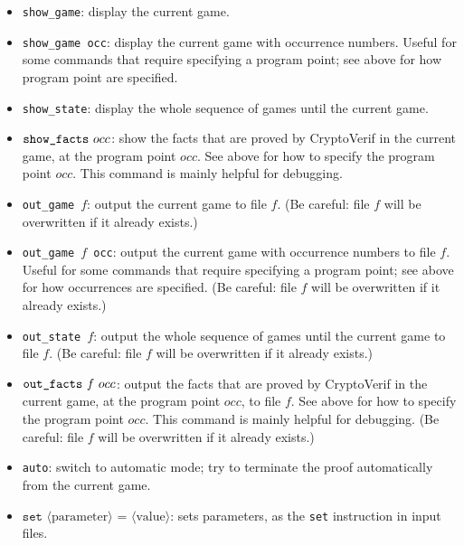 \documentclass{article}
\newcommand{\nonterm}[1]{\langle\textrm{#1}\rangle}
\begin{document}
\begin{itemize}
\item \texttt{show\string_game}: display the current game.

\item \texttt{show\string_game occ}: display the current game with
  occurrence numbers. Useful for some commands that require specifying a
  program point; see above for how program point are specified.

\item \texttt{show\string_state}: display the whole sequence
of games until the current game.

\item $\texttt{show\string_facts}\ occ$: show the facts that are proved
by CryptoVerif in the current game, at the program point $occ$. 
See above for how to specify the program point $occ$.
This command is mainly helpful for debugging.

\item \texttt{out\string_game $f$}: output the current game to file $f$.
  (Be careful: file $f$ will be overwritten if it already exists.)

\item \texttt{out\string_game $f$ occ}: output the current game with
  occurrence numbers to file $f$. Useful for some commands that require specifying a
  program point; see above for how occurrences are specified.
  (Be careful: file $f$ will be overwritten if it already exists.)

\item \texttt{out\string_state $f$}: output the whole sequence
of games until the current game to file $f$.
  (Be careful: file $f$ will be overwritten if it already exists.)

\item $\texttt{out\string_facts}\ f\ occ$: output the facts that are proved
  by CryptoVerif in the current game, at the program point $occ$,
  to file $f$. 
See above for how to specify the program point $occ$.
This command is mainly helpful for debugging.
  (Be careful: file $f$ will be overwritten if it already exists.)

\item \texttt{auto}: switch to automatic mode; try to
terminate the proof automatically from the current game.

\item $\texttt{set }\nonterm{parameter}\texttt{ = }\nonterm{value}$:
sets parameters, as the \texttt{set} instruction in input files.


\end{itemize}
\end{document}
